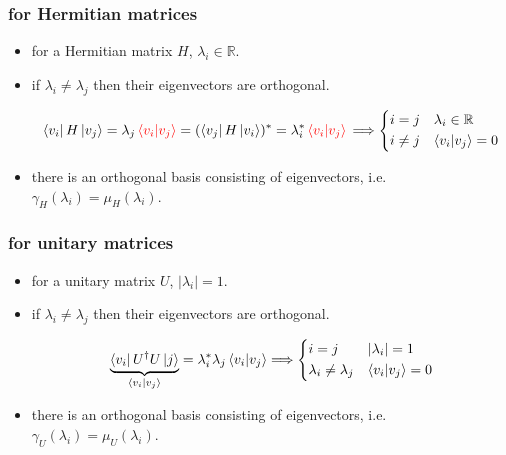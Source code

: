 \subsubsection{for Hermitian matrices}
\begin{itemize}
	\item for a Hermitian matrix $H$, $\lambda_i \in \mathbb{R}$.
	
	\item if $\lambda_i \neq \lambda_j$ then their eigenvectors are orthogonal.
	
	\begin{tcolorbox}[title=proof:]
		\begin{equation}
			\bra{v_i} H \ket{v_j} = \lambda_j \mathcolor{red}{\braket{v_i | v_j}} = (\bra{v_j} H \ket{v_i})^* = \lambda_i^* \mathcolor{red}{\braket{v_i | v_j}} \\ \Longrightarrow \begin{dcases}
				i = j & \lambda_i \in \mathbb{R} \\
				i \neq j & \braket{v_i | v_j} = 0
			\end{dcases}
		\end{equation}
	\end{tcolorbox}
	
	\item there is an orthogonal basis consisting of eigenvectors, i.e. $\gamma_H(\lambda_i) = \mu_H(\lambda_i)$.
\end{itemize}

\subsubsection{for unitary matrices}
\begin{itemize}
	\item for a unitary matrix $U$, $|\lambda_i| = 1$.
	
	\item if $\lambda_i \neq \lambda_j$ then their eigenvectors are orthogonal.
	
	\begin{tcolorbox}[title=proof:]
		\begin{equation}
			\underbrace{\bra{v_i} U^\dag U \ket{j}}_{\braket{v_i | v_j}} = \lambda_i^* \lambda_j \braket{v_i | v_j} \Longrightarrow \begin{dcases}
				i = j & |\lambda_i| = 1 \\
				\lambda_i \neq \lambda_j & \braket{v_i | v_j} = 0
			\end{dcases}
		\end{equation}
	\end{tcolorbox}
	
	\item there is an orthogonal basis consisting of eigenvectors, i.e. $\gamma_U(\lambda_i) = \mu_U(\lambda_i)$.
\end{itemize}

